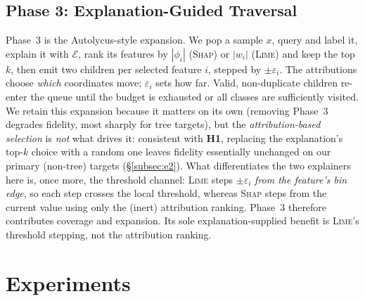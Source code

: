\documentclass[sigconf,anonymous,review]{acmart}
\begin{document}
\subsection{Phase 3: Explanation-Guided Traversal}
\label{subsec:traversal}
Phase~3 is the Autolycus-style expansion. We pop a sample $x$, query and label it,
explain it with $\mathcal{E}$, rank its features by $|\phi_i|$ (\textsc{Shap}) or $|w_i|$
(\textsc{Lime}) and keep the top $k$, then emit two children per selected feature $i$, stepped by
$\pm\varepsilon_i$. The attributions choose \emph{which} coordinates move; $\varepsilon_i$ sets how far. Valid, non-duplicate children re-enter the queue until the budget is
exhausted or all classes are sufficiently visited. We retain this expansion because it matters on its own (removing Phase~3 degrades fidelity, most sharply for tree targets), but the \emph{attribution-based selection} is \emph{not} what drives it:
consistent with \textbf{H1}, replacing the explanation's top-$k$ choice with a random one
leaves fidelity essentially unchanged on our primary (non-tree) targets
(\S\ref{subsec:e2}). What differentiates the two explainers here is, once more, the
threshold channel: \textsc{Lime} steps $\pm\varepsilon_i$ \emph{from the feature's bin edge}, so each step crosses the local threshold, whereas \textsc{Shap} steps from the
current value using only the (inert) attribution ranking. Phase~3 therefore contributes
coverage and expansion. Its sole explanation-supplied benefit is \textsc{Lime}'s
threshold stepping, not the attribution ranking.

\section{Experiments}
\label{sec:experiments}
\end{document}

